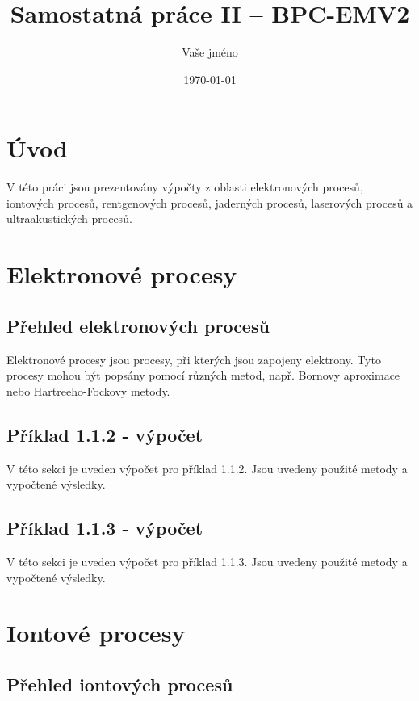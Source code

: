 \documentclass{article}
\begin{document}
\title{Samostatná práce II – BPC-EMV2}
\author{Vaše jméno}
\date{\today}
\maketitle

\section{Úvod}

V této práci jsou prezentovány výpočty z oblasti elektronových procesů, iontových procesů, rentgenových procesů, jaderných procesů, laserových procesů a ultraakustických procesů.

\section{Elektronové procesy}

\subsection{Přehled elektronových procesů}

Elektronové procesy jsou procesy, při kterých jsou zapojeny elektrony. Tyto procesy mohou být popsány pomocí různých metod, např. Bornovy aproximace nebo Hartreeho-Fockovy metody.

\subsection{Příklad 1.1.2 - výpočet}

V této sekci je uveden výpočet pro příklad 1.1.2. Jsou uvedeny použité metody a vypočtené výsledky.

\subsection{Příklad 1.1.3 - výpočet}

V této sekci je uveden výpočet pro příklad 1.1.3. Jsou uvedeny použité metody a vypočtené výsledky.

\section{Iontové procesy}

\subsection{Přehled iontových procesů}
\end{document}
